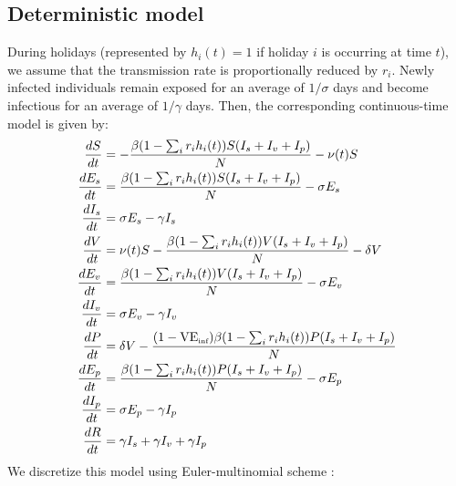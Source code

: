 \documentclass[12pt]{article}
\begin{document}
\subsection*{Deterministic model}

During holidays (represented by $h_i(t) = 1$ if holiday $i$ is occurring at time $t$), we assume that the transmission rate is proportionally reduced by $r_i$. 
Newly infected individuals remain exposed for an average of $1/\sigma$ days and become infectious for an average of $1/\gamma$ days.
Then, the corresponding continuous-time model is given by:
  \begin{align}
  \frac{dS}{dt} &= - \frac{\beta (1 - \sum_i r_i h_i(t)) S (I_s + I_v + I_p)}{N} - \nu(t) S\\
  \frac{dE_s}{dt} &= \frac{\beta (1 - \sum_i r_i h_i(t)) S (I_s + I_v + I_p)}{N} - \sigma E_s\\
  \frac{dI_s}{dt} &= \sigma E_s - \gamma I_s\\
  \frac{dV}{dt} &= \nu(t) S - \frac{\beta (1 - \sum_i r_i h_i(t)) V (I_s + I_v + I_p)}{N} - \delta V\\
  \frac{dE_v}{dt} &= \frac{\beta (1 - \sum_i r_i h_i(t)) V (I_s + I_v + I_p)}{N} - \sigma E_v\\
  \frac{dI_v}{dt} &= \sigma E_v - \gamma I_v\\
  \frac{dP}{dt} &= \delta V - \frac{(1-\mathrm{VE}_{\textrm{\tiny{inf}}})\beta (1 - \sum_i r_i h_i(t)) P (I_s + I_v + I_p)}{N}\\
  \frac{dE_p}{dt} &= \frac{\beta (1 - \sum_i r_i h_i(t)) P (I_s + I_v + I_p)}{N} - \sigma E_p\\
  \frac{dI_p}{dt} &= \sigma E_p - \gamma I_p\\
  \frac{dR}{dt} &= \gamma I_s + \gamma I_v + \gamma I_p\\
  \end{align}
We discretize this model using Euler-multinomial scheme \citep{he2010plug}:
\end{document}
